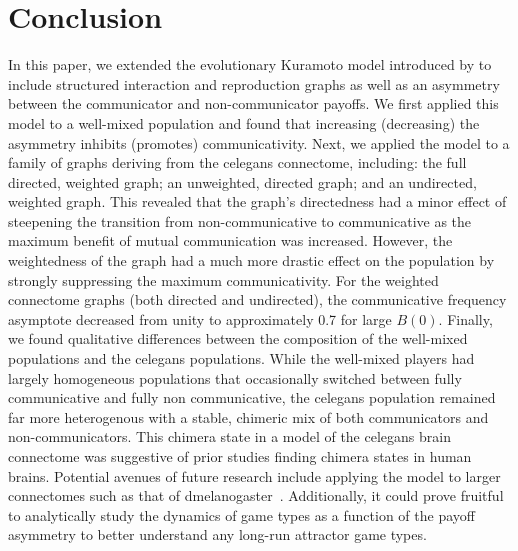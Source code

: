 \documentclass[pdflatex,lineno,referee,sn-mathphys-ay]{sn-jnl}
\begin{document}
\section{Conclusion}
In this paper, we extended the evolutionary Kuramoto model
introduced by \citet{tripp2022evolutionary}
to include structured interaction and reproduction graphs
as well as an asymmetry between
the communicator and non-communicator payoffs.
We first applied this model to a well-mixed population
and found that increasing (decreasing) the asymmetry
inhibits (promotes) communicativity.
Next, we applied the model to
a family of graphs deriving from the \gls{celegans} connectome,
including: the full directed, weighted graph;
an unweighted, directed graph;
and an undirected, weighted graph.
This revealed that the graph's directedness
had a minor effect of steepening the transition
from non-communicative to communicative
as the maximum benefit of mutual communication was increased.
However, the weightedness of the graph had a much more drastic effect
on the population by strongly suppressing the maximum communicativity.
For the weighted connectome graphs (both directed and undirected),
the communicative frequency asymptote decreased from unity
to approximately \num{0.7} for large $B(0)$.
Finally, we found qualitative differences between the composition
of the well-mixed populations and the \gls{celegans} populations.
While the well-mixed players had largely homogeneous populations
that occasionally switched between fully communicative
and fully non communicative,
the \gls{celegans} population remained far more heterogenous
with a stable, chimeric mix of both communicators and non-communicators.
This chimera state in a model of the \gls{celegans} brain connectome
was suggestive of prior studies finding chimera states in human brains.
Potential avenues of future research include applying the model
to larger connectomes such as that
of \gls{dmelanogaster}~\citep{schlegel2024whole}.
Additionally, it could prove fruitful to analytically study
the dynamics of game types as a function of the payoff asymmetry
to better understand any long-run attractor game types.


\backmatter



\appendix
\end{document}
